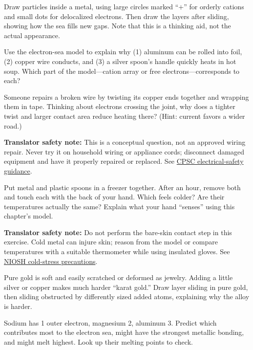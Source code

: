 \begin{sikaoti}
\item Draw particles inside a metal, using large circles marked ``$+$'' for orderly cations and small dots for delocalized electrons. Then draw the layers after sliding, showing how the sea fills new gaps. Note that this is a thinking aid, not the actual appearance.
\item Use the electron-sea model to explain why (1) aluminum can be rolled into foil, (2) copper wire conducts, and (3) a silver spoon's handle quickly heats in hot soup. Which part of the model---cation array or free electrons---corresponds to each?
\item Someone repairs a broken wire by twisting its copper ends together and wrapping them in tape. Thinking about electrons crossing the joint, why does a tighter twist and larger contact area reduce heating there? (Hint: current favors a wider road.)

\textbf{Translator safety note:} This is a conceptual question, not an approved wiring repair. Never try it on household wiring or appliance cords; disconnect damaged equipment and have it properly repaired or replaced. See \href{https://www.cpsc.gov/Newsroom/News-Releases/2000/CPSC-and-NESF-Urge-Consumers-to-Plug-Into-Electrical-Safety}{CPSC electrical-safety guidance}.
\item Put metal and plastic spoons in a freezer together. After an hour, remove both and touch each with the back of your hand. Which feels colder? Are their temperatures actually the same? Explain what your hand ``senses'' using this chapter's model.

\textbf{Translator safety note:} Do not perform the bare-skin contact step in this exercise. Cold metal can injure skin; reason from the model or compare temperatures with a suitable thermometer while using insulated gloves. See \href{https://stacks.cdc.gov/view/cdc/5687/cdc_5687_DS1.pdf}{NIOSH cold-stress precautions}.
\item Pure gold is soft and easily scratched or deformed as jewelry. Adding a little silver or copper makes much harder ``karat gold.'' Draw layer sliding in pure gold, then sliding obstructed by differently sized added atoms, explaining why the alloy is harder.
\item Sodium has 1 outer electron, magnesium 2, aluminum 3. Predict which contributes most to the electron sea, might have the strongest metallic bonding, and might melt highest. Look up their melting points to check.
\end{sikaoti}
